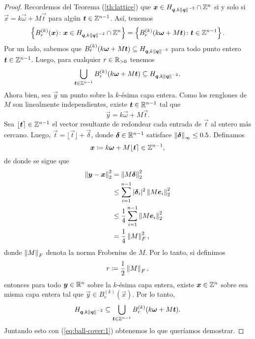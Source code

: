 \begin{proof}
	Recordemos del Teorema (\ref{th:lattice}) que $\boldsymbol{x} \in H_{\boldsymbol{q}, k\left\lVert \boldsymbol{q} \right\rVert^{-2}}
	\cap \mathbb{Z}^n$ si y solo si $\vec{x} = k\vec{\omega} + M\vec{t}$ para algún $\boldsymbol{t} \in \mathbb{Z}^{n-1}$.
	Así, tenemos
	\begin{equation*}
		\left\lbrace B_r^{(k)}(\boldsymbol{x}) \colon \boldsymbol{x} \in H_{\boldsymbol{q}, k\left\lVert \boldsymbol{q} \right\rVert^{-2}} \cap
			\mathbb{Z}^n \right\rbrace
			=
		\left\lbrace B_r^{(k)}(k\boldsymbol{\omega} + M\boldsymbol{t}) \colon \boldsymbol{t} \in \mathbb{Z}^{n-1} \right\rbrace.
	\end{equation*}
	Por un lado, sabemos que $B_r^{(k)}(k\boldsymbol{\omega} + M\boldsymbol{t}) \subseteq H_{\boldsymbol{q}, k\left\lVert \boldsymbol{q} \right\rVert^{-2}}$ para
	todo punto entero $\boldsymbol{t} \in \mathbb{Z}^{n-1}$. Luego, para cualquier $r \in \mathbb{R}_{>0}$ tenemos
	\begin{equation}
		\label{eq:ball-cover:1}
		\bigcup_{\boldsymbol{t} \in \mathbb{Z}^{n-1}}B_r^{(k)}(k\boldsymbol{\omega} + M\boldsymbol{t}) \subseteq
		H_{\boldsymbol{q}, k\left\lVert \boldsymbol{q} \right\rVert^{-2}}.
	\end{equation}
	Ahora bien, sea $\vec{y}$ un punto sobre la $k$-ésima capa entera. Como los renglones de $M$ son
	linealmente independientes, existe $\boldsymbol{t} \in \mathbb{R}^{n-1}$ tal que
	\begin{equation*}
		\vec{y} = k\vec{\omega} + M\vec{t}.
	\end{equation*}
	Sea $\lfloor \boldsymbol{t} \rceil \in \mathbb{Z}^{n-1}$ el vector resultante de redondear cada entrada de
	$\vec{t}$ al entero más cercano. Luego, $\vec{t} = \lfloor \vec{t} \rfloor + \vec{\delta}$,
	donde $\boldsymbol{\delta} \in \mathbb{R}^{n-1}$ satisface $\left\lVert \boldsymbol{\delta} \right\rVert_{\infty} \leq 0.5$. Definamos
	\begin{equation*}
		\boldsymbol{x} \coloneq k\boldsymbol{\omega} + M\lfloor \boldsymbol{t} \rceil \in \mathbb{Z}^{n-1},
	\end{equation*}
	de donde se sigue que
	\begin{align}
		\left\lVert \boldsymbol{y} - \boldsymbol{x} \right\rVert_2^{2} 
		&= \left\lVert M\boldsymbol{\delta} \right\rVert_{2}^{2} \nonumber \\
		&\leq \sum_{i=1}^{n-1}|\boldsymbol{\delta}_i|^2 \left\lVert M\boldsymbol{e}_i \right\rVert_2^{2} \nonumber \\
		&\leq \frac{1}{4}\sum_{i=1}^{n-1} \left\lVert M\boldsymbol{e}_i \right\rVert_2^{2} \label{eq:alt-M-bound} \\
		&= \frac{1}{4}\left\lVert M \right\rVert_F^2, \nonumber
	\end{align}
	donde $\left\lVert M \right\rVert_F$ denota la norma Frobenius de $M$. Por lo tanto, si definimos
	\begin{equation}
		\label{eq:radius}
		r \coloneq \frac{1}{2}\left\lVert M \right\rVert_F,
	\end{equation}
	entonces para todo $\boldsymbol{y} \in \mathbb{R}^n$ sobre la $k$-ésima capa entera, existe $\boldsymbol{x} \in \mathbb{Z}^n$
	sobre esa misma capa entera tal que $\vec{y} \in B_r^{(k)}(\vec{x})$. Por lo tanto,
	\begin{equation}
		\label{eq:ball-cover:2}
		H_{\boldsymbol{q}, k\left\lVert \boldsymbol{q} \right\rVert^{-2}} \subseteq
		\bigcup_{\boldsymbol{t} \in \mathbb{Z}^{n-1}}B_r^{(k)}(k\boldsymbol{\omega} + M\boldsymbol{t}).
	\end{equation}
	Juntando esto con (\ref{eq:ball-cover:1}) obtenemos lo que queríamos demostrar.
\end{proof}

